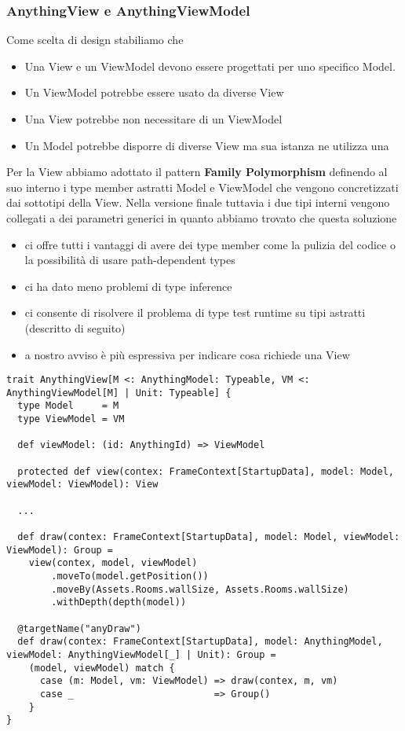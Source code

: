 \subsubsection{AnythingView e AnythingViewModel}
Come scelta di design stabiliamo che 
\begin{itemize}
    \item Una View e un ViewModel devono essere progettati per uno specifico Model. 
    \item Un ViewModel potrebbe essere usato da diverse View
    \item Una View potrebbe non necessitare di un ViewModel
    \item Un Model potrebbe disporre di diverse View ma sua istanza ne utilizza una
\end{itemize}
Per la View abbiamo adottato il pattern \textbf{Family Polymorphism} definendo al suo interno i type member astratti Model e ViewModel che vengono concretizzati dai sottotipi della View.
Nella versione finale tuttavia i due tipi interni vengono collegati a dei parametri generici in quanto abbiamo trovato che questa soluzione
\begin{itemize}
    \item ci offre tutti i vantaggi di avere dei type member come la pulizia del codice o la possibilità di usare path-dependent types
    \item ci ha dato meno problemi di type inference 
    \item ci consente di risolvere il problema di type test runtime su tipi astratti (descritto di seguito)
    \item a nostro avviso è più espressiva per indicare cosa richiede una View
\end{itemize}

\begin{lstlisting}[basicstyle=\tiny]
trait AnythingView[M <: AnythingModel: Typeable, VM <: AnythingViewModel[M] | Unit: Typeable] {
  type Model     = M
  type ViewModel = VM

  def viewModel: (id: AnythingId) => ViewModel

  protected def view(contex: FrameContext[StartupData], model: Model, viewModel: ViewModel): View
  
  ...

  def draw(contex: FrameContext[StartupData], model: Model, viewModel: ViewModel): Group =
    view(contex, model, viewModel)
        .moveTo(model.getPosition())
        .moveBy(Assets.Rooms.wallSize, Assets.Rooms.wallSize)
        .withDepth(depth(model))

  @targetName("anyDraw")
  def draw(contex: FrameContext[StartupData], model: AnythingModel, viewModel: AnythingViewModel[_] | Unit): Group =
    (model, viewModel) match {
      case (m: Model, vm: ViewModel) => draw(contex, m, vm)
      case _                         => Group()
    }
}
\end{lstlisting}

